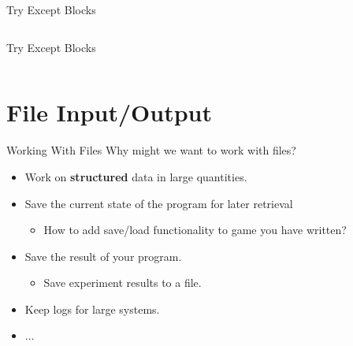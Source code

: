     \begin{frame}{Try Except Blocks}
        \inputminted[frame=single,framesep=2pt]{python3}{./code_examples/try_except_finally.py}
    \end{frame}

    \begin{frame}{Try Except Blocks}
        \LARGE
        \inputminted[frame=single,framesep=2pt,lastline=9]{python3}{./code_examples/try_except.py}
    \end{frame}



    \section{File Input/Output}

    \begin{frame}{Working With Files}
        \LARGE
        Why might we want to work with files?
        \begin{itemize}
            \pause
            \item Work on \textbf{structured} data in large quantities.
            \pause
            \item Save the current state of the program for later retrieval
            \begin{itemize}
                \Large
                \pause
                \item How to add save/load functionality to game you have written?
            \end{itemize}
            \item Save the result of your program.
            \begin{itemize}
                \Large
                \pause
                \item Save experiment results to a file.
            \end{itemize} 
            \pause
            \item Keep logs for large systems.
            \pause
            \item $\dots$
        \end{itemize}
    \end{frame}

